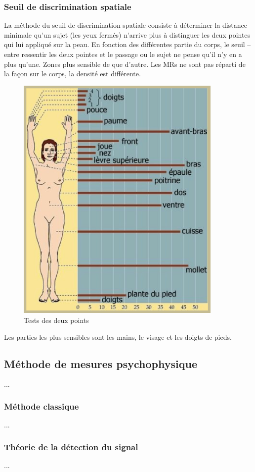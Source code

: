 \subsubsection{Seuil de discrimination spatiale}
La méthode du seuil de discrimination spatiale consiste à déterminer la distance minimale qu’un sujet (les yeux fermés) n’arrive plus à distinguer les deux pointes qui lui appliqué sur la peau. En fonction des différentes partie du corps, le seuil – entre ressentir les deux pointes et le passage ou le sujet ne pense qu’il n’y en a plus qu’une. Zones plus sensible de que d’autre. Les MRs ne sont pas réparti de la façon sur le corps, la densité est différente.\par
\begin{figure}[!h]
	\centering
	\includegraphics[width=10cm]{1_Bible/Photos/Biology/discrim_spatiale.png}
	\caption{Tests des deux points}\label{discrim_spatiale}
\end{figure}
Les parties les plus sensibles sont les mains, le visage et les doigts de pieds.

\subsection{Méthode de mesures psychophysique}
...

\subsubsection{Méthode classique}
...

\subsubsection{Théorie de la détection du signal}
...




